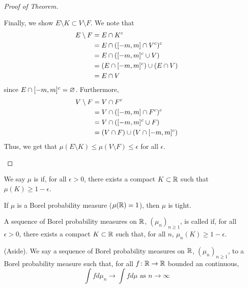 \documentclass[11pt,leqno,oneside]{amsbook}
\numberwithin{thm}{section}
\renewcommand{\emptyset}{\varnothing}
\begin{document}
\begin{proof}[Proof of Theorem]
\begin{itemize}
      Finally, we show $E \setminus K \subset V \setminus F$. We note
      that
      \begin{align*}
        E \setminus F & = E \cap K^c \\
                      & = E \cap ([-m,m] \cap V^c)^c \\
                      & = E \cap ([-m,m]^c \cup V) \\
                      & = (E \cap [-m,m]^c) \cup (E \cap
                        V)\\
                      & = E \cap V
      \end{align*}
      since $E \intersect [-m,m]^c = \emptyset$. Furthermore,
      \begin{align*}
        V \setminus F & = V \cap F^c \\
                      & = V \cap ([-m,m] \cap F^c)^c \\
                      & = V \cap ([-m,m]^c \cup F) \\
        & = (V \cap F) \cup (V \cap [-m,m]^c)
      \end{align*}
      Thus, we get that $\mu(E \setminus K) \leq \mu(V \setminus F)
      \leq \epsilon$ for all $\epsilon$.
    \end{itemize}
  \end{proof}
  \begin{defn}
    We say $\mu$ is  if, for all $\epsilon > 0$, there
    exists a compact $K \subset {\mathbb R}$ such that $\mu(K) \geq
    1-\epsilon$. 
  \end{defn}
  \begin{cor}
    If $\mu$ is a Borel probability measure ($\mu({\mathbb R}) = 1$), then
    $\mu$ is tight.
  \end{cor}
  \begin{defn}
    A sequence of Borel probability measures on ${\mathbb R}$, $(\mu_n)_{n \geq
    1}$, is called  if, for all $\epsilon > 0$,
  there exists a compact $K \subset {\mathbb R}$ such that, for all $n$,
  $\mu_n(K) \geq 1 - \epsilon$.
  \end{defn}
  \begin{defn}
    (Aside). We say a sequence of Borel probability measures on ${\mathbb R}$,
    $(\mu_n)_{n \geq 1}$,  to a Borel probability
    measure such that, for all $f \colon {\mathbb R} \to {\mathbb R}$ bounded an
    continuous, \[
      \int f d \mu_n \to \int f d\mu \text{ as } n \to \infty
    \]
  \end{defn}
\end{document}
